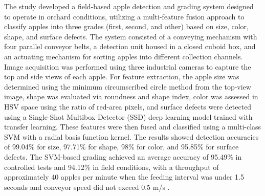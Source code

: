 {

The study developed a field-based apple detection and grading system designed to operate in orchard conditions, utilizing a multi-feature fusion approach to classify apples into three grades (first, second, and other) based on size, color, shape, and surface defects. The system consisted of a conveying mechanism with four parallel conveyor belts, a detection unit housed in a closed cuboid box, and an actuating mechanism for sorting apples into different collection channels. Image acquisition was performed using three industrial cameras to capture the top and side views of each apple. For feature extraction, the apple size was determined using the minimum circumscribed circle method from the top-view image, shape was evaluated via roundness and shape index, color was assessed in HSV space using the ratio of red-area pixels, and surface defects were detected using a Single-Shot Multibox Detector (SSD) deep learning model trained with transfer learning. These features were then fused and classified using a multi-class SVM with a radial basis function kernel. The results showed detection accuracies of 99.04\% for size, 97.71\% for shape, 98\% for color, and 95.85\% for surface defects. The SVM-based grading achieved an average accuracy of 95.49\% in controlled tests and 94.12\% in field conditions, with a throughput of approximately 40 apples per minute when the feeding interval was under 1.5 seconds and conveyor speed did not exceed 0.5 m/s \citep{Hu2021}.


}
